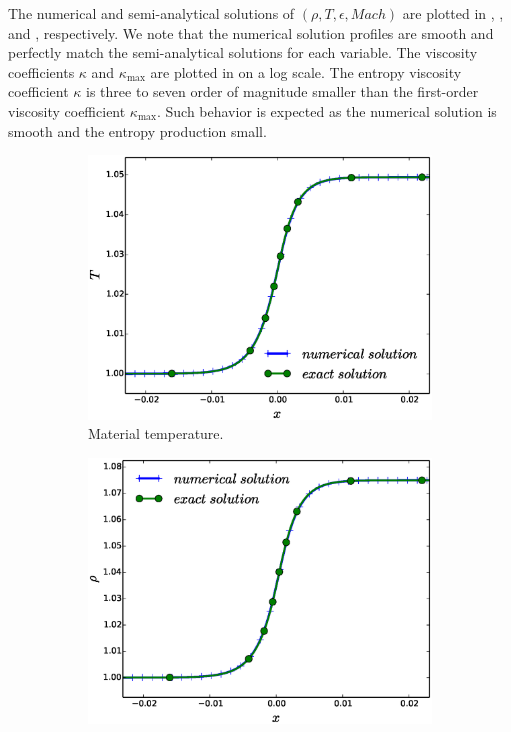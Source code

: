 \documentclass[times,doublespace]{fldauth}%
\begin{document}
The numerical and semi-analytical solutions of $(\rho, T, \epsilon, Mach)$ are plotted in , ,  and , respectively. We note that the numerical solution profiles are smooth and perfectly match the semi-analytical solutions for each variable. The viscosity coefficients $\kappa$ and $\kappa_\text{max}$ are plotted in  on a log scale. The entropy viscosity coefficient $\kappa$ is three to seven order of magnitude smaller than the first-order viscosity coefficient $\kappa_\text{max}$. Such behavior is expected as the numerical solution is smooth and the entropy production small.
%
\begin{figure}[h]
    \centering
    \begin{subfigure}{0.49\textwidth}
    \includegraphics[width=\linewidth]{figures/cst-xs/mach-1p05/mass-diff-mach-1p05-mat-temp-nel-250-plot.eps}
    \caption{Material temperature.}\label{fig:mach-1p05-cst-xs-temp}
    \end{subfigure}
    \begin{subfigure}{0.49\textwidth}
    \includegraphics[width=\linewidth]{figures/cst-xs/mach-1p05/mass-diff-mach-1p05-density-nel-250-plot.eps}

\end{subfigure}
\end{figure}
\end{document}
